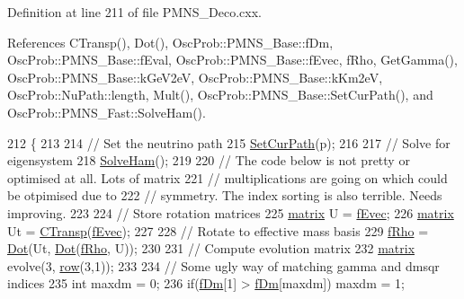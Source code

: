 Definition at line 211 of file P\+M\+N\+S\+\_\+\+Deco.\+cxx.



References C\+Transp(), Dot(), Osc\+Prob\+::\+P\+M\+N\+S\+\_\+\+Base\+::f\+Dm, Osc\+Prob\+::\+P\+M\+N\+S\+\_\+\+Base\+::f\+Eval, Osc\+Prob\+::\+P\+M\+N\+S\+\_\+\+Base\+::f\+Evec, f\+Rho, Get\+Gamma(), Osc\+Prob\+::\+P\+M\+N\+S\+\_\+\+Base\+::k\+Ge\+V2eV, Osc\+Prob\+::\+P\+M\+N\+S\+\_\+\+Base\+::k\+Km2eV, Osc\+Prob\+::\+Nu\+Path\+::length, Mult(), Osc\+Prob\+::\+P\+M\+N\+S\+\_\+\+Base\+::\+Set\+Cur\+Path(), and Osc\+Prob\+::\+P\+M\+N\+S\+\_\+\+Fast\+::\+Solve\+Ham().


\begin{DoxyCode}
212 \{
213 
214   \textcolor{comment}{// Set the neutrino path}
215   \hyperlink{classOscProb_1_1PMNS__Base_a986e6ebef09a7e2eb7fee16a4c2c834d}{SetCurPath}(p);
216 
217   \textcolor{comment}{// Solve for eigensystem}
218   \hyperlink{classOscProb_1_1PMNS__Fast_a8a0828401591e88c60e0051fbfe02d5e}{SolveHam}();
219   
220   \textcolor{comment}{// The code below is not pretty or optimised at all. Lots of matrix}
221   \textcolor{comment}{// multiplications are going on which could be otpimised due to }
222   \textcolor{comment}{// symmetry. The index sorting is also terrible. Needs improving.}
223 
224   \textcolor{comment}{// Store rotation matrices}
225   \hyperlink{classOscProb_1_1PMNS__Deco_a77b4e0c041b6268910a270be0f5387c9}{matrix} U = \hyperlink{classOscProb_1_1PMNS__Base_a093e7bd31d4ef52ed52df414e12c1d17}{fEvec};
226   \hyperlink{classOscProb_1_1PMNS__Deco_a77b4e0c041b6268910a270be0f5387c9}{matrix} Ut = \hyperlink{classOscProb_1_1PMNS__Deco_aca391ff02be7abc2fd3dba40e9ce2665}{CTransp}(\hyperlink{classOscProb_1_1PMNS__Base_a093e7bd31d4ef52ed52df414e12c1d17}{fEvec});
227 
228   \textcolor{comment}{// Rotate to effective mass basis}
229   \hyperlink{classOscProb_1_1PMNS__Deco_a0488d62b4ef4cf5b43425769f5fcdbdf}{fRho} = \hyperlink{classOscProb_1_1PMNS__Deco_a8d6b547de294c0d52d4208bde44fe171}{Dot}(Ut, \hyperlink{classOscProb_1_1PMNS__Deco_a8d6b547de294c0d52d4208bde44fe171}{Dot}(\hyperlink{classOscProb_1_1PMNS__Deco_a0488d62b4ef4cf5b43425769f5fcdbdf}{fRho}, U));
230   
231   \textcolor{comment}{// Compute evolution matrix}
232   \hyperlink{classOscProb_1_1PMNS__Deco_a77b4e0c041b6268910a270be0f5387c9}{matrix} evolve(3, \hyperlink{classOscProb_1_1PMNS__Deco_a34634741bc68bc1c524cf47f44e7f5b6}{row}(3,1));
233   
234   \textcolor{comment}{// Some ugly way of matching gamma and dmsqr indices}
235   \textcolor{keywordtype}{int} maxdm = 0; 
236   \textcolor{keywordflow}{if}(\hyperlink{classOscProb_1_1PMNS__Base_a406a31c3b5d620e5a0cace5b411f9f70}{fDm}[1] > \hyperlink{classOscProb_1_1PMNS__Base_a406a31c3b5d620e5a0cace5b411f9f70}{fDm}[maxdm]) maxdm = 1;

\end{DoxyCode}
